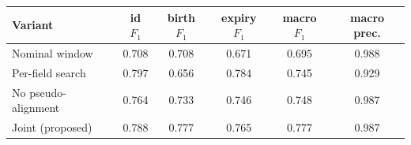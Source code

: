 \begin{tabular}{lccccc}
\toprule
Variant & id $F_1$ & birth $F_1$ & expiry $F_1$ & macro $F_1$ & macro prec.\\
\midrule
Nominal window & 0.708 & 0.708 & 0.671 & 0.695 & 0.988 \\
Per-field search & 0.797 & 0.656 & 0.784 & 0.745 & 0.929 \\
No pseudo-alignment & 0.764 & 0.733 & 0.746 & 0.748 & 0.987 \\
Joint (proposed) & 0.788 & 0.777 & 0.765 & 0.777 & 0.987 \\
\bottomrule
\end{tabular}
